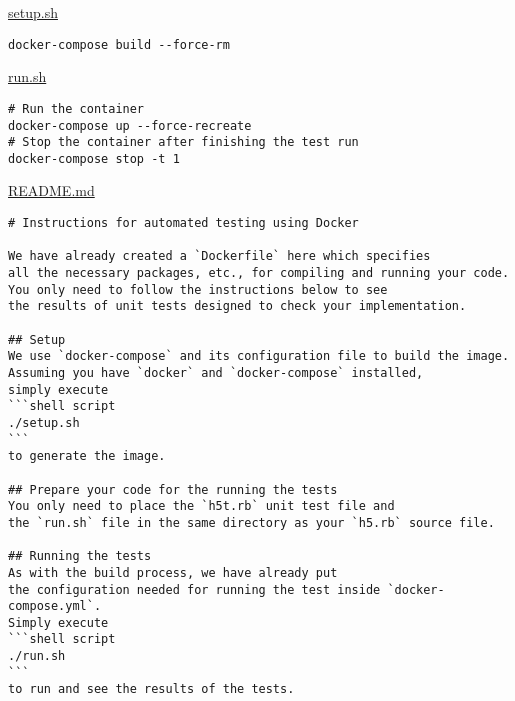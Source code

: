 \documentclass[11pt]{article}
\begin{document}
\href{./testing/h5/setup.sh}{setup.sh}
\begin{verbatim}
docker-compose build --force-rm
\end{verbatim}

\href{./testing/h5/run.sh}{run.sh}
\begin{verbatim}
# Run the container
docker-compose up --force-recreate
# Stop the container after finishing the test run
docker-compose stop -t 1
\end{verbatim}

\href{./testing/h5/README.md}{README.md}
\begin{verbatim}
# Instructions for automated testing using Docker

We have already created a `Dockerfile` here which specifies
all the necessary packages, etc., for compiling and running your code.
You only need to follow the instructions below to see 
the results of unit tests designed to check your implementation.

## Setup
We use `docker-compose` and its configuration file to build the image.
Assuming you have `docker` and `docker-compose` installed,
simply execute
```shell script
./setup.sh
```
to generate the image.

## Prepare your code for the running the tests
You only need to place the `h5t.rb` unit test file and
the `run.sh` file in the same directory as your `h5.rb` source file.

## Running the tests
As with the build process, we have already put
the configuration needed for running the test inside `docker-compose.yml`.
Simply execute
```shell script
./run.sh
```
to run and see the results of the tests.
\end{verbatim}
\end{document}

